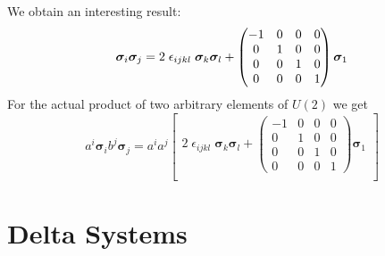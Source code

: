 \documentclass[11pt, oneside]{article}   	%
\begin{document}
%
We obtain an interesting result:
\begin{equation} \bm{\sigma}_i \bm{\sigma}_j = 
    2 \; \epsilon_{ijkl} \; \bm{\sigma}_k \bm{\sigma}_l 
    +
    \begin{pmatrix}
        -1 & 0  & 0  & 0 \\
         0 & 1  & 0  & 0 \\
         0 & 0  & 1  & 0 \\
         0 & 0  & 0  & 1
    \end{pmatrix} \bm{\sigma}_1 \\
\end{equation}
%
For the actual product of two arbitrary elements of $U(2)$ we get
\begin{equation}
    a^i\bm{\sigma}_i b^j\bm{\sigma}_j = 
    a^i a^j
    \begin{bmatrix}
        2 \; \epsilon_{ijkl} \; \bm{\sigma}_k \bm{\sigma}_l +
        \begin{pmatrix}
            -1 & 0  & 0  & 0 \\
             0 & 1  & 0  & 0 \\
             0 & 0  & 1  & 0 \\
             0 & 0  & 0  & 1
        \end{pmatrix} \bm{\sigma}_1 \\
    \end{bmatrix}
\end{equation}

\section{Delta Systems}
\end{document}
